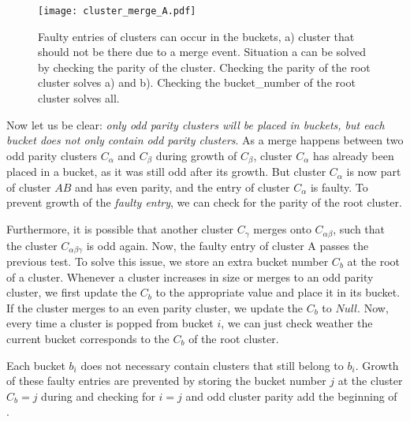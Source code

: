 \begin{figure}
  \centering
  \texttt{[image: cluster\_merge\_A.pdf]}
  \caption{Faulty entries of clusters can occur in the buckets, a) cluster that should not be there due to a merge event. Situation a can be solved by checking the parity of the cluster. Checking the parity of the root cluster solves a) and b). Checking the bucket\_number of the root cluster solves all.}\label{3.fig.clustermergeB}
\end{figure}

Now let us be clear: \emph{only odd parity clusters will be placed in buckets, but each bucket does not only contain odd parity clusters}. As a merge happens between two odd parity clusters $C_\alpha$ and $C_\beta$ during growth of $C_\beta$, cluster $C_\alpha$ has already been placed in a bucket, as it was still odd after its growth. But cluster $C_\alpha$ is now part of cluster $AB$ and has even parity, and the entry of cluster $C_\alpha$ is faulty. To prevent growth of the \emph{faulty entry}, we can check for the parity of the root cluster.

Furthermore, it is possible that another cluster $C_\gamma$ merges onto $C_{\alpha\beta}$, such that the cluster $C_{\alpha\beta\gamma}$ is odd again. Now, the faulty entry of cluster A passes the previous test. To solve this issue, we store an extra bucket number $C_b$ at the root of a cluster. Whenever a cluster increases in size or merges to an odd parity cluster, we first update the $C_b$ to the appropriate value and place it in its bucket. If the cluster merges to an even parity cluster, we update the $C_b$ to $Null$. Now, every time a cluster is popped from bucket $i$, we can just check weather the current bucket corresponds to the $C_b$ of the root cluster.

\begin{lemma}\label{lem:bucket_faulty}
  Each bucket $b_i$ does not necessary contain clusters that still belong to $b_i$. Growth of these faulty entries are prevented by storing the bucket number $j$ at the cluster $C_b = j$ during  and checking for $i=j$ and odd cluster parity add the beginning of .
\end{lemma}

